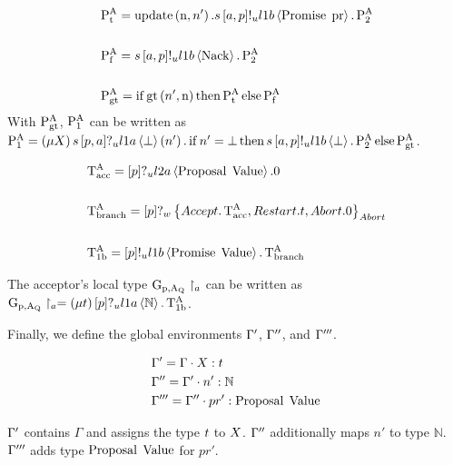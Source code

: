 \begin{align*}
&\operatorname{P^{A}_{t}} = \operatorname{update} \left(\operatorname{n}, n'\right).s\left[a, p\right]!_u l1b \left\langle \operatorname{Promise}\; \operatorname{pr} \right\rangle.\operatorname{P^{A}_{2}}
\\\\
&\operatorname{P^{A}_{f}} = s\left[a, p\right]!_u l1b \left\langle \operatorname{Nack} \right\rangle.\operatorname{P^{A}_{2}}
\\\\
&\operatorname{P^{A}_{gt}} = \operatorname{if} \operatorname{gt}\left(n', \operatorname{n}\right)\operatorname{then} \operatorname{P^{A}_{t}}\operatorname{else} \operatorname{P^{A}_{f}}
\end{align*}
With $\operatorname{P^{A}_{gt}}$, $\operatorname{P^{A}_{1}}$ can be written as $\operatorname{P^{A}_{1}} = \left(\mu X\right)s\left[p, a\right]?_u l1a \left\langle \bot \right\rangle \left(n'\right).\operatorname{if} n'=\bot\operatorname{then} s\left[a, p\right]!_u l1b \left\langle \bot \right\rangle.\operatorname{P^{A}_{2}}\operatorname{else} \operatorname{P^{A}_{gt}}$.

\begin{align*}    
&\operatorname{T^{A}_{acc}} = \left[p\right]?_u l2a \left\langle \operatorname{Proposal}\; \operatorname{Value} \right\rangle.0
\\\\
&\operatorname{T^{A}_{branch}} = \left[p\right]?_w \left\{\mathnormal{Accept} . \operatorname{T^{A}_{acc}} , \mathnormal{Restart} . t , \mathnormal{Abort} .0\right\}_{\mathnormal{Abort}}
\\\\
&\operatorname{T^{A}_{1b}} = \left[p\right]!_u l1b \left\langle \operatorname{Promise}\; \operatorname{Value} \right\rangle . \operatorname{T^{A}_{branch}}
\end{align*}

The acceptor's local type $\operatorname{G_{p, A_Q}} \upharpoonright_{a}$ can be written as $\operatorname{G_{p, A_Q}} \upharpoonright_{a} = \left(\mu t\right)\left[p\right]?_u l1a \left\langle \mathbb{N} \right\rangle.\operatorname{T^{A}_{1b}}$.

Finally, we define the global environments $\Gamma'$, $\Gamma''$, and $\Gamma'''$.

\begin{align*}
&\Gamma' = \Gamma \cdot X:t\\
&\Gamma'' = \Gamma' \cdot n':\mathbb{N}\\
&\Gamma''' = \Gamma'' \cdot pr':\operatorname{Proposal}\; \operatorname{Value}
\end{align*}

$\Gamma'$ contains $\Gamma$ and assigns the type $t$ to $X$.
$\Gamma''$ additionally maps $n'$ to type $\mathbb{N}$.
$\Gamma'''$ adds type $\operatorname{Proposal}\; \operatorname{Value}$ for $pr'$.

